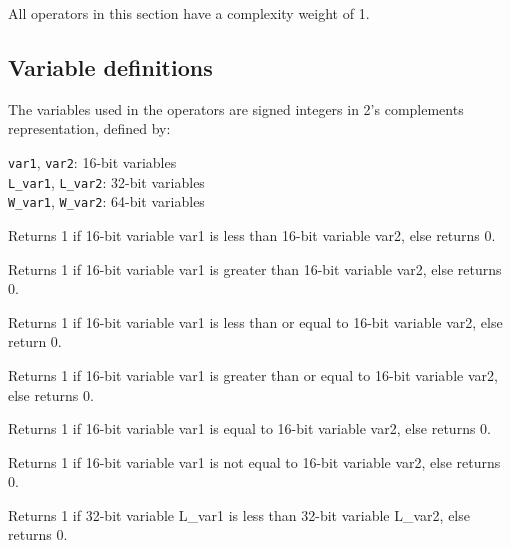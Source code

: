 All operators in this section have a complexity weight of 1.

\subsection{Variable definitions}

The variables used in the operators are signed integers in 2's complements representation, defined by:

{\tt var1}, {\tt var2}: 16-bit variables\\
{\tt L\_var1}, {\tt L\_var2}: 32-bit variables\\
{\tt W\_var1}, {\tt W\_var2}: 64-bit variables


Returns 1 if 16-bit variable var1 is less than 16-bit variable var2, else returns 0.


Returns 1 if 16-bit variable var1 is greater than 16-bit variable var2, else returns 0.


Returns 1 if 16-bit variable var1 is less than or equal to 16-bit variable var2, else return 0.


Returns 1 if 16-bit variable var1 is greater than or equal to 16-bit variable var2, else returns 0.


Returns 1 if 16-bit variable var1 is equal to 16-bit variable var2, else returns 0.


Returns 1 if 16-bit variable var1 is not equal to 16-bit variable var2, else returns 0.


Returns 1 if 32-bit variable L\_var1 is less than 32-bit variable L\_var2, else returns 0.


